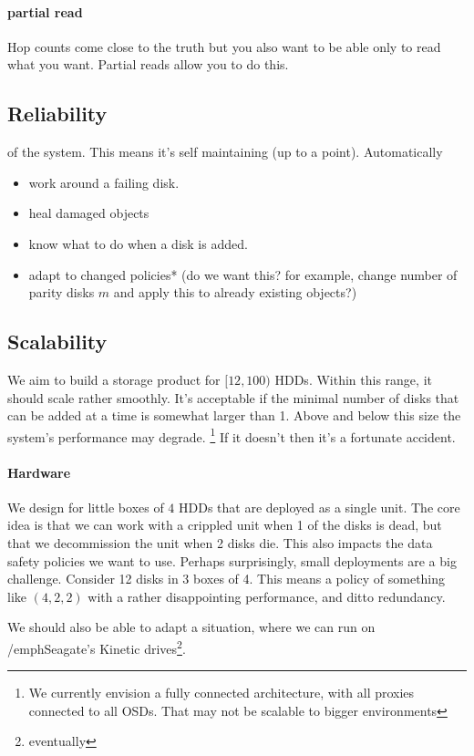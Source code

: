 \paragraph{partial read}
Hop counts come close to the truth but you also want to be able only to read what you want. Partial reads allow you to do this.
\subsection{Reliability} of the system.
This means it's self maintaining (up to a point).
Automatically
\begin{itemize}
  \item{work around a failing disk}.
  \item{heal damaged objects}
  \item{know what to do when a disk is added}.
  \item{adapt to changed policies*}
    (do we want this? for example, change number of parity disks $m$
    and apply this to already existing objects?)
\end{itemize}

\subsection{Scalability}
We aim to build a storage product for $[12, 100)$ HDDs.
Within this range, it should scale rather smoothly.
It's acceptable if the minimal number of disks that can be added at a time is somewhat larger than 1.
Above and below this size the system's performance may degrade.
\footnote{We currently envision a fully connected architecture, with all proxies connected to all OSDs. That may not be scalable to bigger environments}
If it doesn't then it's a fortunate accident.

\paragraph{Hardware}
We design for little boxes of $4$ HDDs that are deployed as a single unit.
The core idea is that we can work with a crippled unit
when 1 of the disks is dead, but that we decommission the unit when 2 disks die.
This also impacts the data safety policies we want to use. Perhaps surprisingly, small deployments are a big challenge. Consider 12 disks in 3 boxes of 4.
This means a policy of something like $(4,2,2)$ with a rather disappointing performance, and ditto redundancy.

We should also be able to adapt a situation,
where we can run on /emph{Seagate's Kinetic drives}\footnote{eventually}.

